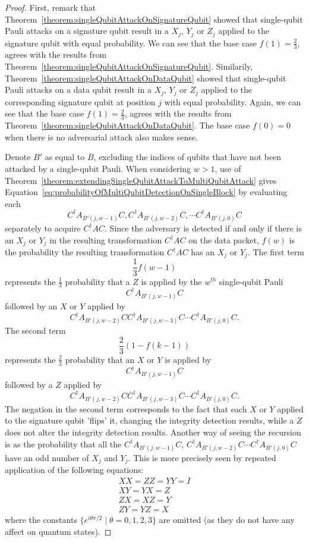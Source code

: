 \begin{proof}
First, remark that
Theorem~\ref{theorem:singleQubitAttackOnSignatureQubit} showed that single-qubit Pauli attacks on a signature qubit result in a $X_j$, $Y_j$ or $Z_j$ applied to the signature qubit with equal probability. We can see that the base case $f(1) = \frac{2}{3}$, agrees with the results from Theorem~\ref{theorem:singleQubitAttackOnSignatureQubit}. Similarily, Theorem~\ref{theorem:singleQubitAttackOnDataQubit} showed that single-qubit Pauli attacks on a data qubit result in a $X_j$, $Y_j$ or $Z_j$ applied to the corresponding signature qubit at position $j$ with equal probability. Again, we can see that the base case $f(1) = \frac{2}{3}$, agrees with the results from Theorem~\ref{theorem:singleQubitAttackOnDataQubit}. The base case $f(0) = 0$ when there is no adversarial attack also makes sense.

Denote $B'$ as equal to $B$, excluding the indices of qubits that have not been attacked by a single-qubit Pauli. When considering $w > 1$, use of Theorem~\ref{theorem:extendingSingleQubitAttackToMultiQubitAttack} gives Equation~\eqref{eq:probabilityOfMultiQubitDetectionOnSingleBlock} by evaluating each $$C^{\dagger}A_{B'(j,w-1)}C, C^{\dagger}A_{B'(j,w-2)}C, \cdots C^{\dagger}A_{B'(j,0)}C$$ separately to acquire $C^{\dagger}AC$. Since the adversary is detected if and only if there is an $X_j$ or $Y_j$ in the resulting transformation $C^{\dagger}AC$ on the data packet, $f(w)$ is the probability the resulting transformation $C^{\dagger}AC$ has an $X_j$ or $Y_j$. The first term $$\frac{1}{3}f(w - 1)$$
represents the $\frac{1}{3}$ probability that a $Z$ is applied by the $w^{th}$ single-qubit Pauli
$$C^{\dagger}A_{B'(j,w-1)}C$$
followed by an $X$ or $Y$ applied by $$C^{\dagger}A_{B'(j,w-2)}C C^{\dagger}A_{B'(j,w-3)}C \cdots C^{\dagger}A_{B'(j,0)}C.$$ The second term
$$\frac{2}{3}(1 - f(k - 1))$$ 
represents the $\frac{2}{3}$ probability that an $X$ or $Y$ is applied by
$$C^{\dagger}A_{B'(j,w-1)}C$$
followed by a $Z$ applied by $$C^{\dagger}A_{B'(j,w-2)}C C^{\dagger}A_{B'(j,w-3)}C \cdots C^{\dagger}A_{B'(j,0)}C.$$ The negation in the second term corresponds to the fact that each $X$ or $Y$ applied to the signature qubit 'flips' it, changing the integrity detection results, while a $Z$ does not alter the integrity detection results. Another way of seeing the recursion is as the probability that all the $C^{\dagger}A_{B'(j,w-1)}C$, $C^{\dagger}A_{B'(j,w-2)}C \cdots C^{\dagger}A_{B'(j,0)}C$ have an odd number of $X_j$ and $Y_j$. This is more precisely seen by repeated application of the following equations:
\begin{align}
XX = ZZ = YY = I \\
XY = YX = Z\\
ZX = XZ = Y\\
ZY = YZ = X
\end{align}
where the constants $\{ e^{i\theta\pi/2} \mid \theta = 0,1,2,3\}$ are omitted (as they do not have any affect on quantum states).


\end{proof}
